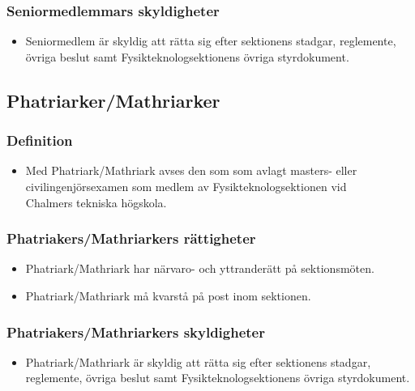 \documentclass[11pt,a4paper]{article}
\begin{document}
\subsubsection{Seniormedlemmars skyldigheter}
\begin{itemize}

  \item Seniormedlem är skyldig att rätta sig efter sektionens stadgar,
  regle\-mente, övriga beslut samt  Fysikteknologsektionens övriga styrdokument.

\end{itemize}



\subsection{Phatriarker/Mathriarker}
\subsubsection{Definition}
\begin{itemize}

  \item Med Phatriark/Mathriark avses den som som avlagt masters-
  eller civil\-ingenjörs\-examen som medlem av Fysik\-teknolog\-sektionen vid\\
  Ch\-al\-mers tekniska högskola.
 
\end{itemize}



\subsubsection{Phatriakers/Mathriarkers rättigheter}
\begin{itemize}

  \item Phatriark/Mathriark har närvaro- och yttranderätt på sektionsmöten.

  \item Phatriark/Mathriark må kvarstå på post inom sektionen.

\end{itemize}



\subsubsection{Phatriakers/Mathriarkers skyldigheter}

\begin{itemize}

  \item Phatriark/Mathriark är skyldig att rätta sig efter sektionens stadgar,
  regle\-mente, övriga beslut samt  Fysikteknologsektionens övriga styrdokument.

\end{itemize}
\end{document}
